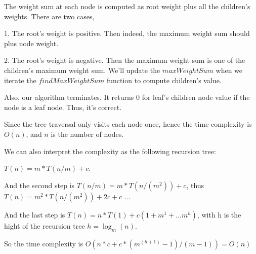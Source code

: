 The weight sum at each node is computed as root weight plus all the children's weights. There are two cases, 

1. The root's weight is positive. Then indeed, the maximum weight sum should plus node weight.

2. The root's weight is negative. Then the maximum weight sum is one of the children's maximum weight sum. We'll update the $maxWeightSum$ when we iterate the $findMaxWeightSum$ function to compute children's value.

Also, our algorithm terminates. It returns 0 for leaf's children node value if the node is a leaf node. Thus, it's correct.


Since the tree traversal only visits each node once, hence the time complexity is $O(n)$, and $n$ is the number of nodes.

We can also interpret the complexity as the following recursion tree: 

$T(n) = m*T(n/m)+ c$.

And the second step is $T(n/m) = m*T(n/(m^2)) + c$, thus $T(n) = m^2*T(n/(m^2)) + 2c + c$ ...

And the last step is $T(n) = n*T(1) + c(1+m^1+...m^h)$, with h is the hight of the recursion tree $h = \log_m(n)$.

So the time complexity is $O(n*c + c*(m^(h+1)-1)/(m-1)) = O(n)$



